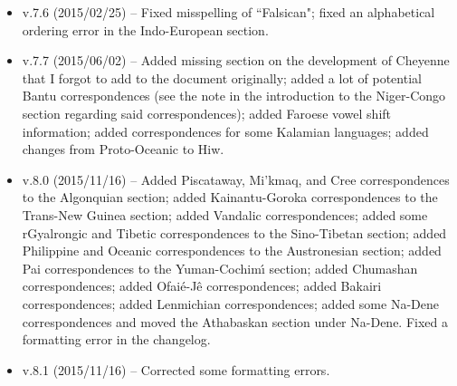 \begin{itemize}
\item v.7.6 (2015/02/25) -- Fixed misspelling of ``Falsican"; fixed an alphabetical ordering 
error in the Indo-European section.
\item v.7.7 (2015/06/02) -- Added missing section on the development of Cheyenne that I forgot to add to the document originally; added a lot of potential Bantu correspondences (see the note in the introduction to the Niger-Congo section regarding said correspondences); added Faroese vowel shift information; added correspondences for some Kalamian languages; added changes from Proto-Oceanic to Hiw.
\item v.8.0 (2015/11/16) -- Added Piscataway, Mi'kmaq, and Cree correspondences to the Algonquian section; added Kainantu-Goroka correspondences to the Trans-New Guinea section; added Vandalic correspondences; added some rGyalrongic and Tibetic correspondences to the Sino-Tibetan section; added Philippine and Oceanic correspondences to the Austronesian section; added Pai correspondences to the Yuman-Cochim\'{\i} section; added Chumashan correspondences; added Ofai\'{e}-J\^{e} correspondences; added Bakairi correspondences; added Lenmichian correspondences; added some Na-Dene correspondences and moved the Athabaskan section under Na-Dene. Fixed a formatting error in the changelog.
\item v.8.1 (2015/11/16) -- Corrected some formatting errors.
\end{itemize}
\clearpage

